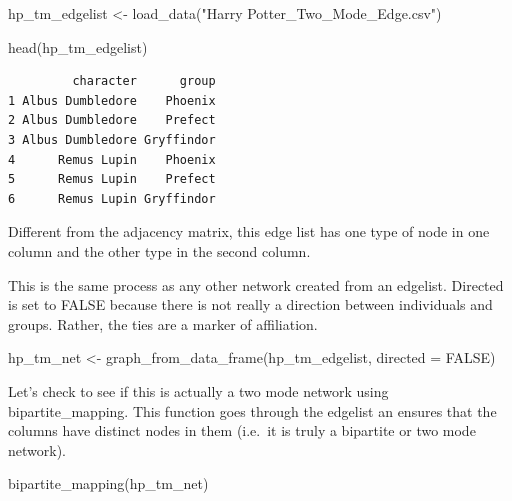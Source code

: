 \documentclass[
  letterpaper,
  DIV=11,
  numbers=noendperiod]{scrreprt}
\newenvironment{Shaded}{\begin{snugshade}}{\end{snugshade}}
\newcommand{\AttributeTok}[1]{\textcolor[rgb]{0.40,0.45,0.13}{#1}}
\newcommand{\ConstantTok}[1]{\textcolor[rgb]{0.56,0.35,0.01}{#1}}
\newcommand{\FunctionTok}[1]{\textcolor[rgb]{0.28,0.35,0.67}{#1}}
\newcommand{\NormalTok}[1]{\textcolor[rgb]{0.00,0.23,0.31}{#1}}
\newcommand{\OtherTok}[1]{\textcolor[rgb]{0.00,0.23,0.31}{#1}}
\newcommand{\StringTok}[1]{\textcolor[rgb]{0.13,0.47,0.30}{#1}}
\begin{document}
\begin{Shaded}
\begin{Highlighting}[]
\NormalTok{hp\_tm\_edgelist }\OtherTok{\textless{}{-}} \FunctionTok{load\_data}\NormalTok{(}\StringTok{"Harry Potter\_Two\_Mode\_Edge.csv"}\NormalTok{)}

\FunctionTok{head}\NormalTok{(hp\_tm\_edgelist)}
\end{Highlighting}
\end{Shaded}

\begin{verbatim}
         character      group
1 Albus Dumbledore    Phoenix
2 Albus Dumbledore    Prefect
3 Albus Dumbledore Gryffindor
4      Remus Lupin    Phoenix
5      Remus Lupin    Prefect
6      Remus Lupin Gryffindor
\end{verbatim}

Different from the adjacency matrix, this edge list has one type of node
in one column and the other type in the second column.

This is the same process as any other network created from an edgelist.
Directed is set to FALSE because there is not really a direction between
individuals and groups. Rather, the ties are a marker of affiliation.

\begin{Shaded}
\begin{Highlighting}[]
\NormalTok{hp\_tm\_net }\OtherTok{\textless{}{-}} \FunctionTok{graph\_from\_data\_frame}\NormalTok{(hp\_tm\_edgelist, }\AttributeTok{directed =} \ConstantTok{FALSE}\NormalTok{)}
\end{Highlighting}
\end{Shaded}

Let's check to see if this is actually a two mode network using
bipartite\_mapping. This function goes through the edgelist an ensures
that the columns have distinct nodes in them (i.e.~it is truly a
bipartite or two mode network).

\begin{Shaded}
\begin{Highlighting}[]
\FunctionTok{bipartite\_mapping}\NormalTok{(hp\_tm\_net)}
\end{Highlighting}
\end{Shaded}
\end{document}
